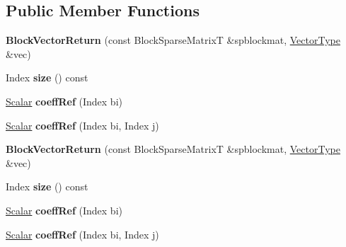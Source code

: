 \subsection*{Public Member Functions}
\begin{DoxyCompactItemize}
\item 
\mbox{\label{class_eigen_1_1_block_vector_return_a659b3ca2d668a47e38c28df08fed57ec}} 
{\bfseries Block\+Vector\+Return} (const Block\+Sparse\+MatrixT \&spblockmat, \hyperlink{struct_vector_type}{Vector\+Type} \&vec)
\item 
\mbox{\label{class_eigen_1_1_block_vector_return_aeb50e8420baab72348e94318891746b1}} 
Index {\bfseries size} () const
\item 
\mbox{\label{class_eigen_1_1_block_vector_return_a4be7014cf6f62103bd98f867ca23cad4}} 
\hyperlink{group___core___module_class_eigen_1_1_ref}{Scalar} {\bfseries coeff\+Ref} (Index bi)
\item 
\mbox{\label{class_eigen_1_1_block_vector_return_aec21974621e4d468742175e3cd0467cd}} 
\hyperlink{group___core___module_class_eigen_1_1_ref}{Scalar} {\bfseries coeff\+Ref} (Index bi, Index j)
\item 
\mbox{\label{class_eigen_1_1_block_vector_return_a659b3ca2d668a47e38c28df08fed57ec}} 
{\bfseries Block\+Vector\+Return} (const Block\+Sparse\+MatrixT \&spblockmat, \hyperlink{struct_vector_type}{Vector\+Type} \&vec)
\item 
\mbox{\label{class_eigen_1_1_block_vector_return_aeb50e8420baab72348e94318891746b1}} 
Index {\bfseries size} () const
\item 
\mbox{\label{class_eigen_1_1_block_vector_return_a4be7014cf6f62103bd98f867ca23cad4}} 
\hyperlink{group___core___module_class_eigen_1_1_ref}{Scalar} {\bfseries coeff\+Ref} (Index bi)
\item 
\mbox{\label{class_eigen_1_1_block_vector_return_aec21974621e4d468742175e3cd0467cd}} 
\hyperlink{group___core___module_class_eigen_1_1_ref}{Scalar} {\bfseries coeff\+Ref} (Index bi, Index j)
\end{DoxyCompactItemize}
